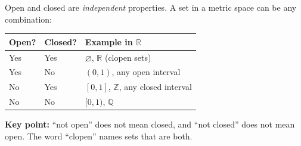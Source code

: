 \begin{tcolorbox}[colback=gray!6, colframe=gray!40, arc=2pt,
  left=8pt, right=8pt, top=6pt, bottom=6pt,
  title={\small\textbf{Part VII \enspace The Four Possibilities}},
  fonttitle=\small\bfseries]
\small
Open and closed are \emph{independent} properties.
A set in a metric space can be any combination:

\renewcommand{\arraystretch}{1.55}
\begin{tabular}{p{2.4cm} p{2.6cm} p{6.4cm}}
\toprule
\textbf{Open?} & \textbf{Closed?} & \textbf{Example in $\mathbb{R}$} \\
\midrule

Yes & Yes   & $\varnothing$, $\mathbb{R}$ (clopen sets) \\[2pt]
Yes & No    & $(0,1)$, any open interval \\[2pt]
No  & Yes   & $[0,1]$, $\mathbb{Z}$, any closed interval \\[2pt]
No  & No    & $[0,1)$, $\mathbb{Q}$ \\[2pt]

\bottomrule
\end{tabular}

\medskip
\noindent\textbf{Key point:} ``not open'' does not mean closed, and
``not closed'' does not mean open.
The word ``clopen'' names sets that are both.
\end{tcolorbox}
